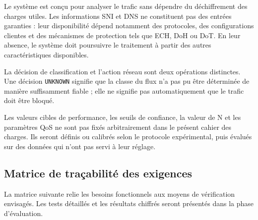 Le système est conçu pour analyser le trafic sans dépendre du
déchiffrement des charges utiles. Les informations SNI et DNS ne
constituent pas des entrées garanties : leur disponibilité dépend
notamment des protocoles, des configurations clientes et des mécanismes
de protection tels que ECH, DoH ou DoT. En leur absence, le système
doit poursuivre le traitement à partir des autres caractéristiques
disponibles.

La décision de classification et l'action réseau sont deux opérations
distinctes. Une décision \texttt{UNKNOWN} signifie que la classe du flux
n'a pas pu être déterminée de manière suffisamment fiable ; elle ne
signifie pas automatiquement que le trafic doit être bloqué.

Les valeurs cibles de performance, les seuils de confiance, la valeur
de N et les paramètres QoS ne sont pas fixés arbitrairement dans le
présent cahier des charges. Ils seront définis ou calibrés selon le
protocole expérimental, puis évalués sur des données qui n'ont pas
servi à leur réglage.

\subsection{Matrice de traçabilité des exigences}

La matrice suivante relie les besoins fonctionnels aux moyens de
vérification envisagés. Les tests détaillés et les résultats chiffrés
seront présentés dans la phase d'évaluation.

